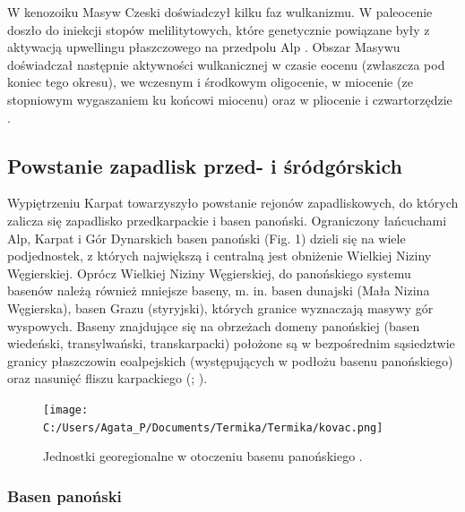\documentclass[11.5pt,twoside]{report}
\begin{document}
W kenozoiku Masyw Czeski doświadczył kilku faz wulkanizmu. W paleocenie doszło do iniekcji stopów melilitytowych, które genetycznie powiązane były z aktywacją upwellingu płaszczowego na przedpolu Alp \parencite{Dezes.2004}. Obszar Masywu doświadczał następnie aktywności wulkanicznej w czasie eocenu (zwłaszcza pod koniec tego okresu),  we wczesnym i środkowym oligocenie, w miocenie (ze stopniowym wygaszaniem ku końcowi miocenu) oraz w pliocenie i czwartorzędzie \parencite{Dezes.2004}. 


	
	
	\subsection{Powstanie zapadlisk przed- i śródgórskich}
	
Wypiętrzeniu Karpat towarzyszyło powstanie rejonów zapadliskowych, do których zalicza się zapadlisko przedkarpackie i basen panoński. Ograniczony łańcuchami Alp, Karpat i Gór Dynarskich basen panoński (Fig. 1) dzieli się na wiele podjednostek, z których największą i centralną jest obniżenie Wielkiej Niziny Węgierskiej. Oprócz Wielkiej Niziny Węgierskiej, do panońskiego systemu basenów należą również mniejsze baseny, m. in. basen dunajski (Mała Nizina Węgierska), basen Grazu (styryjski), których granice wyznaczają masywy gór wyspowych. Baseny znajdujące się na obrzeżach domeny panońskiej (basen wiedeński, transylwański, transkarpacki) położone są w bezpośrednim sąsiedztwie granicy płaszczowin eoalpejskich (występujących w podłożu basenu panońskiego) oraz nasunięć fliszu karpackiego (\cite{Kovac.2007}; \cite{Fodor.1999}).

\begin{figure}[h]
	\centering
	\texttt{[image: C:/Users/Agata\_P/Documents/Termika/Termika/kovac.png]}
	\caption{Jednostki georegionalne w otoczeniu basenu panońskiego \parencite{Kovac.2007}.}
	\label{Fig.}
\end{figure}



		\subsubsection{Basen panoński}
\end{document}
